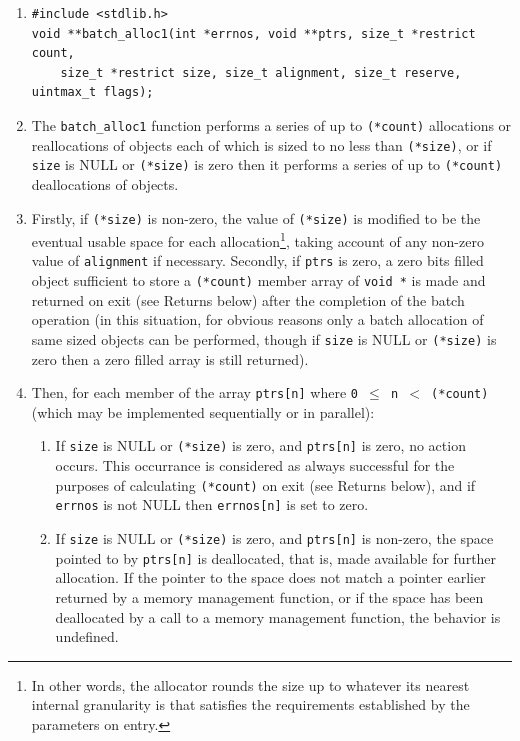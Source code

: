 \documentclass[wd]{isov2}
\begin{document}
{\color{changed}
\begin{enumerate}
\renewcommand{\theenumi}{\arabic{enumi}}
\item \begin{verbatim}
#include <stdlib.h>
void **batch_alloc1(int *errnos, void **ptrs, size_t *restrict count,
    size_t *restrict size, size_t alignment, size_t reserve, uintmax_t flags);
\end{verbatim}
\item The \texttt{batch\_alloc1} function performs a series of up to \texttt{(*count)} allocations or reallocations of objects each of which is sized to no less than \texttt{(*size)}, or if \texttt{size} is NULL or \texttt{(*size)} is zero then it performs a series of up to \texttt{(*count)} deallocations of objects.
\item Firstly, if \texttt{(*size)} is non-zero, the value of \texttt{(*size)} is modified to be the eventual usable space for each allocation\footnote{In other words, the allocator rounds the size up to whatever its nearest internal granularity is that satisfies the requirements established by the parameters on entry.}, taking account of any non-zero value of \texttt{alignment} if necessary. Secondly, if \texttt{ptrs} is zero, a zero bits filled object sufficient to store a \texttt{(*count)} member array of \texttt{void *} is made and returned on exit (see Returns below) after the completion of the batch operation (in this situation, for obvious reasons only a batch allocation of same sized objects can be performed, though if \texttt{size} is NULL or \texttt{(*size)} is zero then a zero filled array is still returned).
\item Then, for each member of the array \texttt{ptrs[n]} where \texttt{0 $\le$ n $<$ (*count)} (which may be implemented sequentially or in parallel):
\begin{enumerate}
\renewcommand{\theenumii}{\alph{enumii}}
\item If \texttt{size} is NULL or \texttt{(*size)} is zero, and \texttt{ptrs[n]} is zero, no action occurs. This occurrance is considered as always successful for the purposes of calculating \texttt{(*count)} on exit (see Returns below), and if \texttt{errnos} is not NULL then \texttt{errnos[n]} is set to zero.

\item If \texttt{size} is NULL or \texttt{(*size)} is zero, and \texttt{ptrs[n]} is non-zero, the space pointed to by \texttt{ptrs[n]} is deallocated, that is, made available for further allocation. If the pointer to the space does not match a pointer earlier returned by a memory management function, or if the space has been deallocated by a call to a memory management function, the behavior is undefined.


\end{enumerate}
\end{enumerate}}
\end{document}
